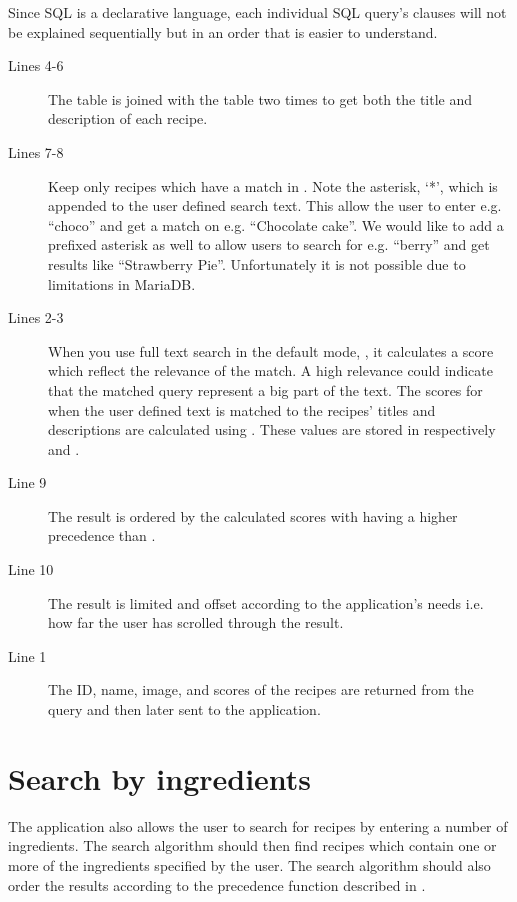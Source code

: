 Since SQL is a declarative language, each individual SQL query's clauses will not be explained sequentially but in an order that is easier to understand.
\begin{description}
\item[Lines 4-6] The  table is joined with the  table two times to get both the title and description of each recipe.
\item[Lines 7-8] Keep only recipes which have a match in . Note the asterisk, `*', which is appended to the user defined search text. This allow the user to enter e.g. ``choco'' and get a match on e.g. ``Chocolate cake''. We would like to add a prefixed asterisk as well to allow users to search for e.g. ``berry'' and get results like ``Strawberry Pie''. Unfortunately it is not possible due to limitations in MariaDB\cite{mariafulltext}.
\item[Lines 2-3] When you use full text search in the default mode, \linebreak{}, it calculates a score which reflect the relevance of the match. A high relevance could indicate that the matched query represent a big part of the text. The scores for when the user defined text is matched to the recipes' titles and descriptions are calculated using . These values are stored in respectively  and .
\item[Line 9] The result is ordered by the calculated scores with  having a higher precedence than .
\item[Line 10] The result is limited and offset according to the application's needs i.e. how far the user has scrolled through the result.
\item[Line 1] The ID, name, image, and scores of the recipes are returned from the query and then later sent to the application.
\end{description}



\section{Search by ingredients}
The application also allows the user to search for recipes by entering a number of ingredients. The search algorithm should then find recipes which contain one or more of the ingredients specified by the user. The search algorithm should also order the results according to the precedence function described in .

